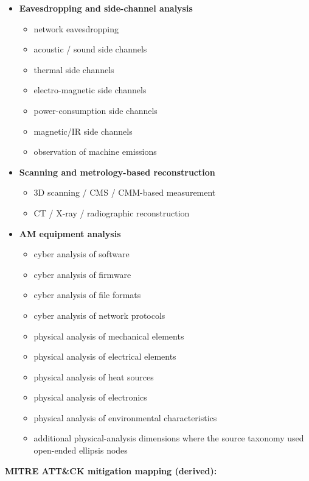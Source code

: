 \documentclass[10pt,a4paper,oneside]{report}
\begin{document}
\begin{itemize}
\item \textbf{Eavesdropping and side-channel analysis}
\begin{itemize}
\item network eavesdropping
\item acoustic / sound side channels
\item thermal side channels
\item electro-magnetic side channels
\item power-consumption side channels
\item magnetic/IR side channels
\item observation of machine emissions
\end{itemize}
\item \textbf{Scanning and metrology-based reconstruction}
\begin{itemize}
\item 3D scanning / CMS / CMM-based measurement
\item CT / X-ray / radiographic reconstruction
\end{itemize}
\item \textbf{AM equipment analysis}
\begin{itemize}
\item cyber analysis of software
\item cyber analysis of firmware
\item cyber analysis of file formats
\item cyber analysis of network protocols
\item physical analysis of mechanical elements
\item physical analysis of electrical elements
\item physical analysis of heat sources
\item physical analysis of electronics
\item physical analysis of environmental characteristics
\item additional physical-analysis dimensions where the source taxonomy used open-ended ellipsis nodes
\end{itemize}
\end{itemize}

\textbf{MITRE ATT\&CK mitigation mapping (derived):}
\end{document}

